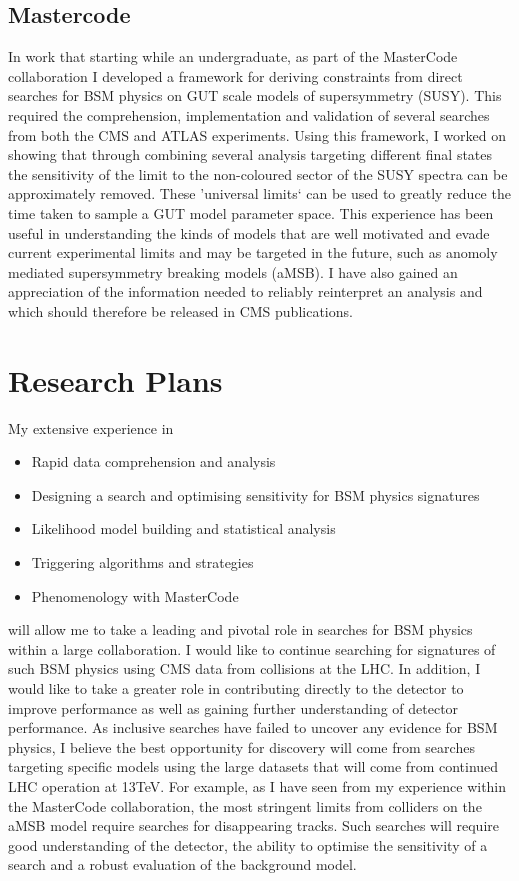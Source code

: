 \documentclass[11pt]{article}
\theoremstyle{plain} \numberwithin{equation}{section}
\theoremstyle{definition}
\begin{document}
\subsection*{Mastercode}
In work that starting while an undergraduate, as part of the MasterCode collaboration I developed a framework for 
deriving constraints from direct searches for BSM physics on GUT scale models of supersymmetry 
(SUSY). This required the comprehension, implementation and validation of several 
searches from both the CMS and ATLAS experiments. Using this framework, I worked on
showing that through combining several analysis targeting different final states the sensitivity of the 
limit to the non-coloured sector of the SUSY spectra can be approximately removed. 
These 'universal limits` can be used to greatly reduce the 
time taken to sample a GUT model parameter space. This experience has been useful in understanding
the kinds of models that are well motivated and evade current experimental limits and may be targeted in the 
future, such as anomoly mediated supersymmetry breaking models (aMSB). I have also gained an appreciation
of the information needed to reliably reinterpret an analysis and which should therefore be released in CMS publications.

\section*{Research Plans}

My extensive experience in

\begin{itemize}
\item Rapid data comprehension and analysis
\item Designing a search and optimising sensitivity for BSM physics signatures
\item Likelihood model building and statistical analysis 
\item Triggering algorithms and strategies
\item Phenomenology with MasterCode
\end{itemize}

will allow me to take a leading and pivotal role in searches for BSM physics within a large collaboration.
I would like to continue searching for signatures of such BSM physics using CMS data from collisions at the LHC.
In addition, I would like to take a greater role in contributing directly to the detector to improve performance
as well as gaining further understanding of detector performance. As inclusive searches have failed 
to uncover any evidence for BSM physics, I believe the best opportunity for discovery will 
come from searches targeting specific models using the large datasets that will come
from continued LHC operation at 13TeV. For example, as I have seen from my experience within 
the MasterCode collaboration, the most stringent limits from colliders on the aMSB 
model require searches for disappearing tracks. Such searches will require good understanding of the detector,
the ability to optimise the sensitivity of a search and a robust evaluation of the background model.
\end{document}
